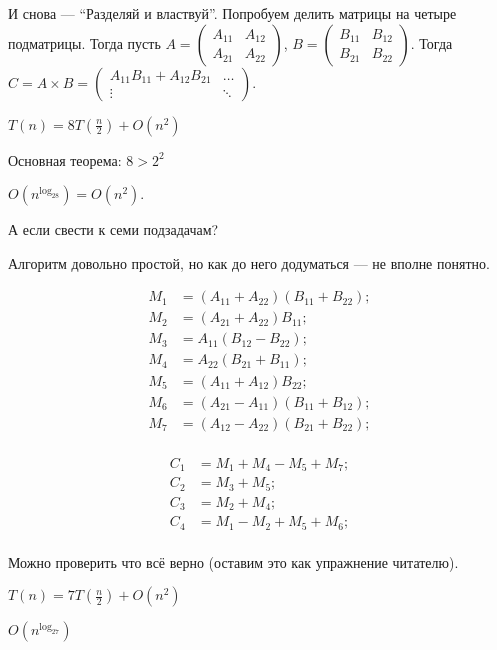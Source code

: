 И снова --- ``Разделяй и властвуй''. Попробуем делить матрицы на четыре подматрицы. Тогда пусть $A = \begin{pmatrix}
    A_{11}&A_{12}\\
    A_{21}&A_{22}
\end{pmatrix}$, 
$B = \begin{pmatrix}
    B_{11}&B_{12}\\
    B_{21}&B_{22}
\end{pmatrix}$.
Тогда $C = A\times B =
\begin{pmatrix}
    A_{11}B_{11}+A_{12}B_{21}&\ldots\\
    \vdots&\ddots
\end{pmatrix}$.

$T(n) = 8T\left( \frac{n}{2} \right) + O(n^2)$

Основная теорема: $8 > 2^2$

$O\left( n^{\log_28} \right) = O(n^2)$.

А если свести к семи подзадачам?

Алгоритм довольно простой, но как до него додуматься --- не вполне понятно.

\begin{align*}
    M_1 &= (A_{11} + A_{22})(B_{11}+B_{22}); \\
    M_2 &= (A_{21} + A_{22})B_{11}; \\
    M_3 &= A_{11}(B_{12}-B_{22}); \\
    M_4 &= A_{22}(B_{21}+B_{11}); \\
    M_5 &= (A_{11} + A_{12})B_{22}; \\
    M_6 &= (A_{21} - A_{11})(B_{11}+B_{12}); \\
    M_7 &= (A_{12} - A_{22})(B_{21}+B_{22}); \\
\end{align*}

\begin{align*}
    C_1 &= M_1+M_4-M_5+M_7; \\
    C_2 &= M_3+M_5; \\
    C_3 &= M_2+M_4; \\
    C_4 &= M_1-M_2+M_5+M_6; \\
\end{align*}

Можно проверить что всё верно (оставим это как упражнение читателю).

$T(n) = 7T\left( \frac{n}{2} \right) + O(n^2)$

$O\left( n^{\log_27} \right)$

